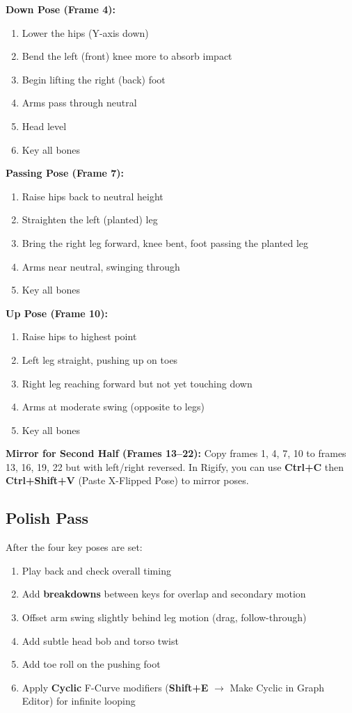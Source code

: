 \textbf{Down Pose (Frame 4):}
\begin{enumerate}[leftmargin=2em]
  \item Lower the hips (Y-axis down)
  \item Bend the left (front) knee more to absorb impact
  \item Begin lifting the right (back) foot
  \item Arms pass through neutral
  \item Head level
  \item Key all bones
\end{enumerate}

\textbf{Passing Pose (Frame 7):}
\begin{enumerate}[leftmargin=2em]
  \item Raise hips back to neutral height
  \item Straighten the left (planted) leg
  \item Bring the right leg forward, knee bent, foot passing the planted leg
  \item Arms near neutral, swinging through
  \item Key all bones
\end{enumerate}

\textbf{Up Pose (Frame 10):}
\begin{enumerate}[leftmargin=2em]
  \item Raise hips to highest point
  \item Left leg straight, pushing up on toes
  \item Right leg reaching forward but not yet touching down
  \item Arms at moderate swing (opposite to legs)
  \item Key all bones
\end{enumerate}

\textbf{Mirror for Second Half (Frames 13--22):}
Copy frames 1, 4, 7, 10 to frames 13, 16, 19, 22 but with left/right reversed. In Rigify, you can use \textbf{Ctrl+C} then \textbf{Ctrl+Shift+V} (Paste X-Flipped Pose) to mirror poses.

\subsection{Polish Pass}

After the four key poses are set:

\begin{enumerate}[leftmargin=2em]
  \item Play back and check overall timing
  \item Add \textbf{breakdowns} between keys for overlap and secondary motion
  \item Offset arm swing slightly behind leg motion (drag, follow-through)
  \item Add subtle head bob and torso twist
  \item Add toe roll on the pushing foot
  \item Apply \textbf{Cyclic} F-Curve modifiers (\textbf{Shift+E} $\rightarrow$ Make Cyclic in Graph Editor) for infinite looping
\end{enumerate}

